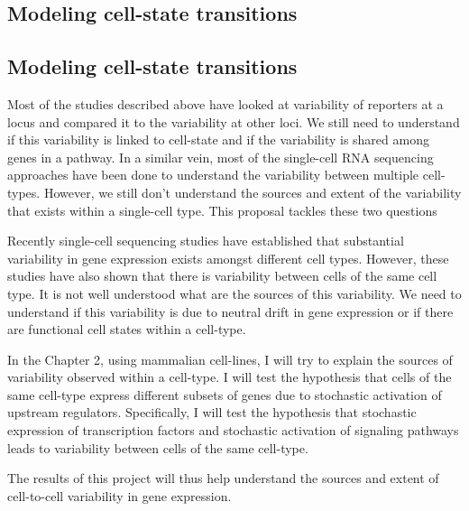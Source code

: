 \subsection{Modeling cell-state transitions}

\subsection{Modeling cell-state transitions}

Most of the studies described above have looked at variability of reporters at a locus and compared it to the variability at other loci. We still need to understand if this variability is linked to cell-state and if the variability is shared among genes in a pathway. In a similar vein, most of the single-cell RNA sequencing approaches have been done to understand the variability between multiple cell-types. However, we still don't understand the sources and extent of the variability that exists within a single-cell type. This proposal tackles these two questions

Recently single-cell sequencing studies have established that substantial variability in gene expression exists amongst different cell types. However, these studies have also shown that there is variability between cells of the same cell type. It is not well understood what are the sources of this variability. We need to understand if this variability is due to neutral drift in gene expression or if there are functional cell states within a cell-type.

In the Chapter 2, using mammalian cell-lines, I will try to explain the sources of variability observed within a cell-type. I will test the hypothesis that cells of the same cell-type express different subsets of genes due to stochastic activation of upstream regulators. Specifically, I will test the hypothesis that stochastic expression of transcription factors and stochastic activation of signaling pathways leads to variability between cells of the same cell-type.

The results of this project will thus help understand the sources and extent of cell-to-cell variability in gene expression. 



